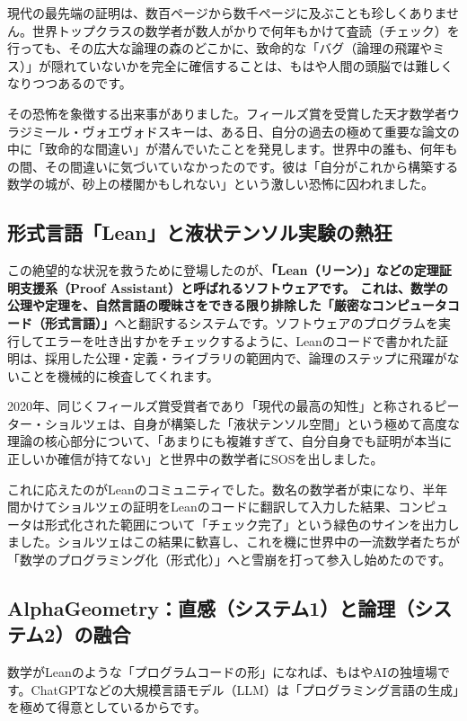 現代の最先端の証明は、数百ページから数千ページに及ぶことも珍しくありません。世界トップクラスの数学者が数人がかりで何年もかけて査読（チェック）を行っても、その広大な論理の森のどこかに、致命的な「バグ（論理の飛躍やミス）」が隠れていないかを完全に確信することは、もはや人間の頭脳では難しくなりつつあるのです。

その恐怖を象徴する出来事がありました。フィールズ賞を受賞した天才数学者ウラジミール・ヴォエヴォドスキーは、ある日、自分の過去の極めて重要な論文の中に「致命的な間違い」が潜んでいたことを発見します。世界中の誰も、何年もの間、その間違いに気づいていなかったのです。彼は「自分がこれから構築する数学の城が、砂上の楼閣かもしれない」という激しい恐怖に囚われました。

\subsection{形式言語「Lean」と液状テンソル実験の熱狂}

この絶望的な状況を救うために登場したのが、\textbf{「Lean（リーン）」などの定理証明支援系（Proof Assistant）と呼ばれるソフトウェアです。 これは、数学の公理や定理を、自然言語の曖昧さをできる限り排除した「厳密なコンピュータコード（形式言語）」}へと翻訳するシステムです。ソフトウェアのプログラムを実行してエラーを吐き出すかをチェックするように、Leanのコードで書かれた証明は、採用した公理・定義・ライブラリの範囲内で、論理のステップに飛躍がないことを機械的に検査してくれます。

2020年、同じくフィールズ賞受賞者であり「現代の最高の知性」と称されるピーター・ショルツェは、自身が構築した「液状テンソル空間」という極めて高度な理論の核心部分について、「あまりにも複雑すぎて、自分自身でも証明が本当に正しいか確信が持てない」と世界中の数学者にSOSを出しました。

これに応えたのがLeanのコミュニティでした。数名の数学者が束になり、半年間かけてショルツェの証明をLeanのコードに翻訳して入力した結果、コンピュータは形式化された範囲について「チェック完了」という緑色のサインを出力しました。ショルツェはこの結果に歓喜し、これを機に世界中の一流数学者たちが「数学のプログラミング化（形式化）」へと雪崩を打って参入し始めたのです。

\subsection{AlphaGeometry：直感（システム1）と論理（システム2）の融合}

数学がLeanのような「プログラムコードの形」になれば、もはやAIの独壇場です。ChatGPTなどの大規模言語モデル（LLM）は「プログラミング言語の生成」を極めて得意としているからです。


